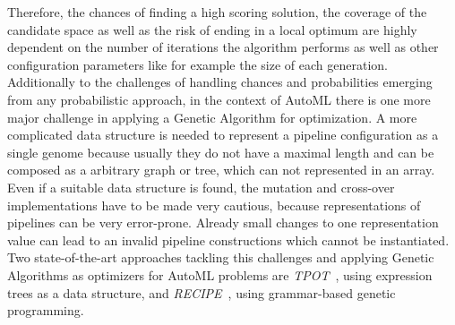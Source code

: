 Therefore, the chances of finding a high scoring solution, the coverage of the candidate space as well as the risk of ending in a local optimum are highly dependent on the number of iterations the algorithm performs as well as other configuration parameters like for example the size of each generation.\newline
Additionally to the challenges of handling chances and probabilities emerging from any probabilistic approach, in the context of AutoML there is one more major challenge in applying a Genetic Algorithm for optimization.
A more complicated data structure is needed to represent a pipeline configuration as a single genome because usually they do not have a maximal length and can be composed as a arbitrary graph or tree, which can not represented in an array.
Even if a suitable data structure is found, the mutation and cross-over implementations have to be made very cautious, because representations of pipelines can be very error-prone.
Already small changes to one representation value can lead to an invalid pipeline constructions which cannot be instantiated.\newline
Two state-of-the-art approaches tackling this challenges and applying Genetic Algorithms as optimizers for AutoML problems are \textit{TPOT}~\cite{Olson-Tpot}, using expression trees as a data structure, and \textit{RECIPE}~\cite{Guimar-Recipe}, using grammar-based genetic programming.

